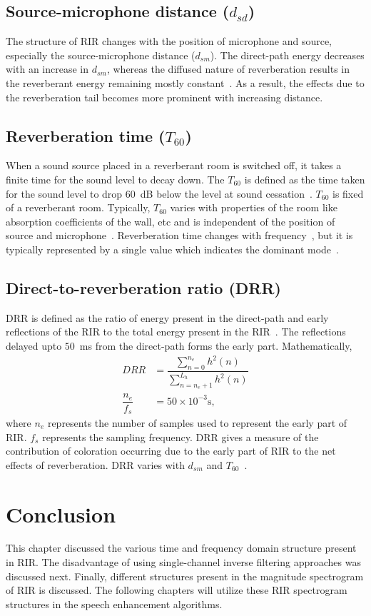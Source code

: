 \subsection{Source-microphone distance ($d_{sd}$)}
The structure of RIR changes with the position of microphone and source, especially the source-microphone distance ($d_{sm}$). The direct-path energy decreases with an increase in $d_{sm}$, whereas the diffused nature of reverberation results in the reverberant energy remaining mostly constant~\cite{naylor2010speech}. As a result, the effects due to the reverberation tail becomes more prominent with increasing distance.

\subsection{Reverberation time ($T_{60}$)}
When a sound source placed in a reverberant room is switched off, it takes a finite time for the sound level to decay down. The $T_{60}$ is defined as the time taken for the sound level to drop $60$~dB below the level at sound cessation~\cite{ratnam2003blind}. $T_{60}$ is fixed of a reverberant room. Typically, $T_{60}$ varies with properties of the room like absorption coefficients of the wall, etc and is independent of the position of source and microphone~\cite{naylor2010speech}. Reverberation time changes with frequency~\cite{jeub2010we}, but it is typically represented by a single value which indicates the dominant mode~\cite{naylor2010speech}.  

\subsection{Direct-to-reverberation ratio (DRR)}
DRR is defined as the ratio of energy present in the direct-path and early reflections of the RIR to the total energy present in the RIR~\cite{kinoshita2016summary}. The reflections delayed upto  $50$~ms from the direct-path forms the early part. Mathematically,
\begin{align}
DRR &= \dfrac{\sum_{n=0}^{n_e}h^2(n)}{\sum_{n=n_e+1}^{L_h} h^2(n)} \nonumber \\
\dfrac{n_e}{f_s}  &= 50\times 10^{-3} \text{s,}
\end{align} 
where $n_e$ represents the number of samples used to represent the early part of RIR. $f_s$ represents the sampling frequency. DRR gives a measure of the contribution of coloration occurring due to the early part of RIR to the net effects of reverberation. DRR varies with $d_{sm}$ and $T_{60}$~\cite{naylor2010speech}.

\section{Conclusion}
This chapter discussed the various time and frequency domain structure present in RIR. The disadvantage of using single-channel inverse filtering approaches was discussed next. Finally, different structures present in the magnitude spectrogram of RIR is discussed. The following chapters will utilize these RIR spectrogram structures in the speech enhancement algorithms.